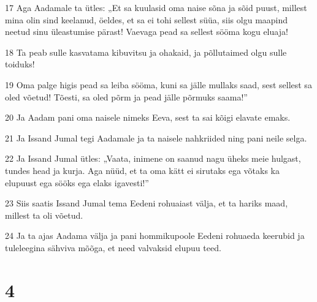\par 17 Aga Aadamale ta ütles: „Et sa kuulasid oma naise sõna ja sõid puust, millest mina olin sind keelanud, öeldes, et sa ei tohi sellest süüa, siis olgu maapind neetud sinu üleastumise pärast! Vaevaga pead sa sellest sööma kogu eluaja!
\par 18 Ta peab sulle kasvatama kibuvitsu ja ohakaid, ja põllutaimed olgu sulle toiduks!
\par 19 Oma palge higis pead sa leiba sööma, kuni sa jälle mullaks saad, sest sellest sa oled võetud! Tõesti, sa oled põrm ja pead jälle põrmuks saama!”
\par 20 Ja Aadam pani oma naisele nimeks Eeva, sest ta sai kõigi elavate emaks.
\par 21 Ja Issand Jumal tegi Aadamale ja ta naisele nahkriided ning pani neile selga.
\par 22 Ja Issand Jumal ütles: „Vaata, inimene on saanud nagu üheks meie hulgast, tundes head ja kurja. Aga nüüd, et ta oma kätt ei sirutaks ega võtaks ka elupuust ega sööks ega elaks igavesti!”
\par 23 Siis saatis Issand Jumal tema Eedeni rohuaiast välja, et ta hariks maad, millest ta oli võetud.
\par 24 Ja ta ajas Aadama välja ja pani hommikupoole Eedeni rohuaeda keerubid ja tuleleegina sähviva mõõga, et need valvaksid elupuu teed.

\chapter{4}


